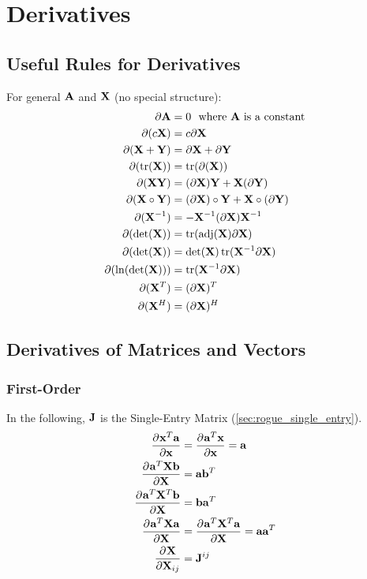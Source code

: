 \chapter{Derivatives}

\section{Useful Rules for Derivatives}
For general $\mathbf{A}$ and $\mathbf{X}$ (no special structure):
\begin{align}
\partial\mathbf{A}           &= 0~~\textrm{where $\mathbf{A}$ is a constant} \\
\partial(c\mathbf{X})        &= c\partial\mathbf{X}                          \\
\partial(\mathbf{X}+\mathbf{Y})     &= \partial\mathbf{X}+\partial\mathbf{Y}               \\
\partial(\operatorname{tr}(\mathbf{X})) &= \operatorname{tr}(\partial(\mathbf{X}))                 \\
\partial(\mathbf{X}\mathbf{Y})      &= (\partial\mathbf{X})\mathbf{Y} + \mathbf{X}(\partial\mathbf{Y})   \\
\partial(\mathbf{X}\circ\mathbf{Y}) &= (\partial\mathbf{X})\circ\mathbf{Y} + \mathbf{X}\circ(\partial\mathbf{Y}) \\
\partial(\mathbf{X}^{-1})    &= -\mathbf{X}^{-1}(\partial\mathbf{X})\mathbf{X}^{-1}        \\
\partial(\det(\mathbf{X}))   &= \operatorname{tr}(\textrm{adj}(\mathbf{X})\partial\mathbf{X})  \\
\partial(\det(\mathbf{X}))   &= \det(\mathbf{X})\operatorname{tr}(\mathbf{X}^{-1}\partial\mathbf{X})  \\
\partial(\ln(\det(\mathbf{X}))) &= \operatorname{tr}(\mathbf{X}^{-1}\partial\mathbf{X})        \\
\partial(\mathbf{X}^T)       &= (\partial\mathbf{X})^T                       \\
\partial(\mathbf{X}^H)       &= (\partial\mathbf{X})^H                       
\end{align}

\section{Derivatives of Matrices and Vectors}

\subsection{First-Order}

In the following, $\mathbf{J}$ is the Single-Entry Matrix (\autoref{sec:rogue_single_entry}).
\begin{align}
\pd{\vx^T \va}{\vx}     &= \pd{\va^T \vx}{\vx} = \va          \\
\pd{\va^T\mX\vb}{\mX}   &= \va\vb^T                           \\
\pd{\va^T\mX^T\vb}{\mX} &= \vb\va^T                           \\
\pd{\va^T\mX\va}{\mX}   &= \pd{\va^T\mX^T\va}{\mX} = \va\va^T \\
\pd{\mX}{\mX_{ij}}      &= \mJ^{ij}                              %
\end{align}

